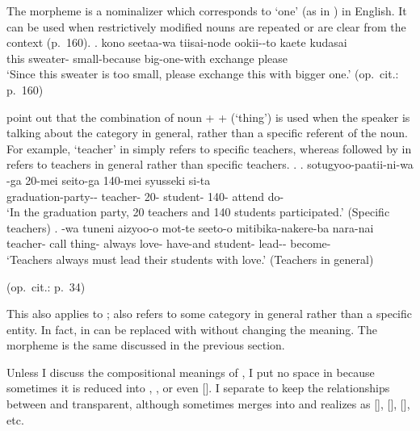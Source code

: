 The morpheme  is a nominalizer which corresponds to `one' (as in ) in English.
It can be used when restrictively modified nouns are repeated or are clear from the context (p.\ 160).
%
\exg. kono seetaa-wa tiisai-node ookii--to kaete kudasai \\
	this sweater- small-because big-one-with exchange please \\
	`Since this sweater is too small, please exchange this with bigger one.'
	\hfill{(op.\ cit.: p.\ 160)}

 point out that
the combination of noun +  +  (`thing') is used
when the speaker is talking about the category in general,
rather than a specific referent of the noun.
For example,  `teacher' in \Next[a] simply refers to specific teachers,
whereas  followed by  in \Next[b] refers to teachers in general rather than specific teachers.
%
\ex.
 \ag. sotugyoo-paatii-ni-wa -ga 20-mei seito-ga 140-mei syusseki si-ta \\
	graduation-party-- teacher- 20- student- 140- attend do- \\
	`In the graduation party, 20 teachers and 140 students participated.'
	\hfill{(Specific teachers)}
 \bg.   -wa tuneni aizyoo-o mot-te seeto-o mitibika-nakere-ba nara-nai \\
 teacher- call thing- always love- have-and student- lead-- become- \\
 `Teachers always must lead their students with love.'
 \hfill{(Teachers in general)}
 \begin{flushright}
 	(op.\ cit.: p.\ 34)
 \end{flushright}

This also applies to ;
 also refers to some category in general rather than a specific entity.
In fact,  in \Last[b] can be replaced with  without changing the meaning.
The morpheme  is the same  discussed in the previous section.

Unless I discuss the compositional meanings of ,
I put no space in 
because sometimes it is reduced into , , or even [].
I separate  to keep the relationships between  and  transparent,
although  sometimes merges into 
and realizes as [], [], [], etc.

